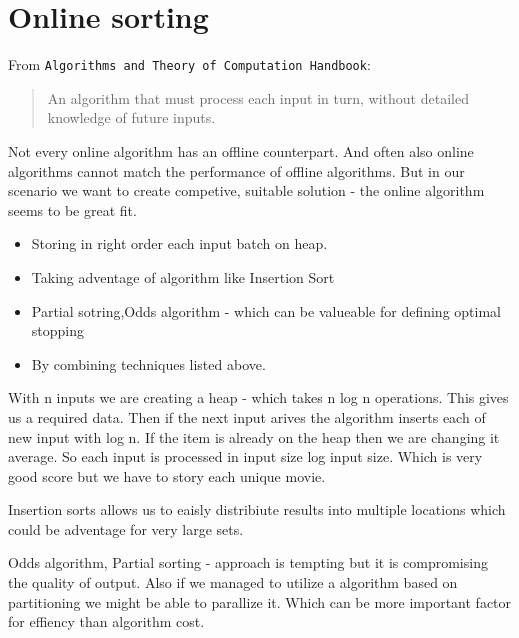 \section{Online sorting}
From \texttt{Algorithms and Theory of Computation Handbook}:
\begin{quote}
An algorithm that must process each input in turn, without detailed knowledge
of future inputs.
\end{quote}

Not every online algorithm has an offline counterpart. And often also online
algorithms cannot match the performance of offline algorithms.
But in our scenario we want to create competive, suitable solution - the online
algorithm seems to be great fit.

\begin{itemize}
	\item{Storing in right order each input batch on heap.}
	\item{Taking adventage of algorithm like Insertion Sort}
	\item{Partial sotring,Odds algorithm - which can be valueable for defining optimal stopping}
  \item{By combining techniques listed above. }
\end{itemize}

With n inputs we are creating a heap - which takes n log n operations. This gives
us a required data. Then if the next input arives the algorithm inserts each
of new input with log n. If the item is already on the heap then we are changing
it average. So each input is processed in input size log input size.
Which is very good score but we have to story each unique movie.

Insertion sorts allows us to eaisly distribiute results into multiple locations
which could be adventage for very large sets.

Odds algorithm, Partial sorting - approach is tempting but it is compromising
the quality of output. Also if we managed to utilize a algorithm based on
partitioning we might be able to parallize it. Which can be more important factor
for effiency than algorithm cost.
